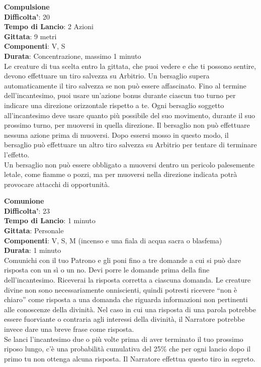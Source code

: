\begin{multicols}{2}
\medskip\textbf{Compulsione}\\
\textbf{Difficolta'}: 20\\
\textbf{Tempo di Lancio}: 2 Azioni\\
\textbf{Gittata}: 9 metri\\
\textbf{Componenti}: V, S\\
\textbf{Durata}: Concentrazione, massimo 1 minuto\\
Le creature di tua scelta entro la gittata, che puoi vedere e che ti possono sentire, devono effettuare un tiro salvezza su Arbitrio. Un bersaglio supera automaticamente il tiro salvezza se non può essere affascinato. Fino al termine dell’incantesimo, puoi usare un’azione bonus durante ciascun tuo turno per indicare una direzione orizzontale rispetto a te. Ogni bersaglio soggetto all’incantesimo deve usare quanto più possibile del suo movimento, durante il suo prossimo turno, per muoversi in quella direzione. Il bersaglio non può effettuare nessuna azione prima di muoversi. Dopo essersi mosso in questo modo, il bersaglio può effettuare un altro tiro salvezza su Arbitrio per tentare di terminare l’effetto.\\
Un bersaglio non può essere obbligato a muoversi dentro un pericolo palesemente letale, come fiamme o pozzi, ma per muoversi nella direzione indicata potrà provocare attacchi di opportunità.

\medskip\textbf{Comunione}\\
\textbf{Difficolta'}: 23\\
\textbf{Tempo di Lancio}: 1 minuto\\
\textbf{Gittata}: Personale\\
\textbf{Componenti}: V, S, M (incenso e una fiala di acqua sacra o blasfema)\\
\textbf{Durata}: 1 minuto\\
Comunichi con il tuo Patrono e gli poni fino a tre domande a cui si può dare risposta con un sì o un no. Devi porre le domande prima della fine dell’incantesimo. Riceverai la risposta corretta a ciascuna domanda. Le creature divine non sono necessariamente onniscienti, quindi potresti ricevere “non è chiaro” come risposta a una domanda che riguarda informazioni non pertinenti alle conoscenze della divinità. Nel caso in cui una risposta di una parola potrebbe essere fuorviante o contraria agli interessi della divinità, il Narratore potrebbe invece dare una breve frase come risposta.\\
Se lanci l’incantesimo due o più volte prima di aver terminato il tuo prossimo riposo lungo, c’è una probabilità cumulativa del 25\% che per ogni lancio dopo il primo tu non ottenga alcuna risposta. Il Narratore effettua questo tiro in segreto.


\end{multicols}
